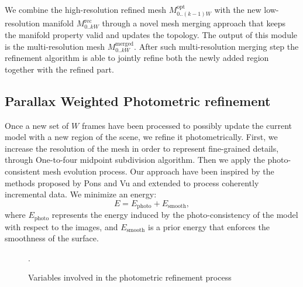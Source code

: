 \documentclass[times,10pt,twocolumn]{article}
\begin{document}
We combine the high-resolution refined mesh  $\mathit{M}_{0..(k-1)W}^{\text{opt}}$  with the new low-resolution manifold $\mathit{M}_{0..kW}^{\text{rec}}$ through a novel mesh merging approach that keeps the manifold property valid and updates the topology. 
The output of this module is the multi-resolution mesh $\mathit{M}_{0..kW}^{\text{merged}}$.
After such multi-resolution merging step the refinement algorithm is able to jointly refine both the newly added region together with the refined part.


\subsection{Parallax Weighted Photometric refinement}%
\label{subsec:photo}
Once a new set of $W$ frames have been processed to possibly update the current model with a new region of the scene, we refine it photometrically. 
First, we increase the resolution of the mesh in order to represent fine-grained details, through One-to-four midpoint subdivision algorithm.
Then we apply the photo-consistent mesh evolution process.
Our approach have been inspired by the methods proposed by Pons \etal \cite{pons2007multi} and Vu \etal
\cite{vu_et_al_2012} and extended to process coherently incremental data. 
We minimize an energy:
\begin{equation}
\label{eq:en}
E = E_{\textrm{photo}} + E_{\textrm{smooth}},
\end{equation}
where  $E_{\textrm{photo}}$ represents the energy induced by  the photo-consistency of the model with respect to the images, and $E_{\textrm{smooth}}$ is a prior energy that enforces the smoothness of the surface. 

\begin{figure}[t]
\centering
  \def\svgwidth{200pt}
  
\caption{Variables involved in the photometric refinement process}.
\label{fig:cameraproj}
\end{figure}
\end{document}
